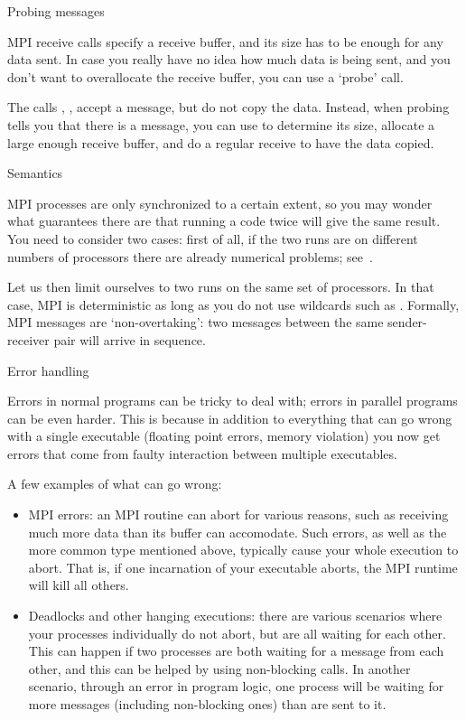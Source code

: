  {Probing messages}

MPI receive calls specify a receive buffer, and its size has to be
enough for any data sent. In case you really have no idea how much data
is being sent, and you don't want to overallocate the receive buffer,
you can use a `probe' call.

The calls , , accept a message,
but do not copy the data. Instead, when probing tells you that there is a
message, you can use  to determine its size,
allocate a large enough receive buffer, and do a regular receive to
have the data copied.

 {Semantics}
\label{sec:mpi-semantics}

MPI processes are only synchronized to a certain extent, so you may
wonder what guarantees there are that running a code twice will give
the same result.  You need to consider two cases: first of all, if the
two runs are on different numbers of processors there are already
numerical problems; see~.

Let us then limit ourselves to two runs on the same set of processors. 
In that case, MPI is deterministic as long as you do not use 
wildcards such as . Formally, 
MPI messages are `non-overtaking': two messages between the same
sender-receiver pair will arrive in sequence.


 {Error handling}

Errors in normal programs can be tricky to deal with; errors in
parallel programs can be even harder. This is because in addition to
everything that can go wrong with a single executable (floating point
errors, memory violation) you now get errors that come from faulty
interaction between multiple executables.

A few examples of what can go wrong:
\begin{itemize}
\item MPI errors: an MPI routine can abort for various reasons, such
  as receiving much more data than its buffer can accomodate. Such
  errors, as well as the more common type mentioned above, typically
  cause your whole execution to abort. That is, if one incarnation of
  your executable aborts, the MPI runtime will kill all others.
\item Deadlocks and other hanging executions: there are various
  scenarios where your processes individually do not abort, but are all
  waiting for each other. This can happen if two processes are both
  waiting for a message from each other, and this can be helped by
  using non-blocking calls. In another scenario, through an error in
  program logic, one process will be waiting for more messages
  (including non-blocking ones) than are sent to it.
\end{itemize}

